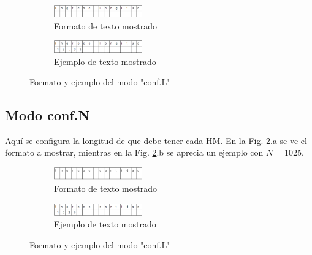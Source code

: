 \documentclass[main_conf.tex]{subfiles}
\begin{document}
\begin{figure}[!t]
  \centering
  \begin{subfigure}[b]{0.5\textwidth}
    \centering
    \includegraphics[width=1.5in]{../img/modo/conf_L_view.png}
    \caption{Formato de texto mostrado}
  \end{subfigure}

  \begin{subfigure}[b]{0.5\textwidth}
    \centering
    \includegraphics[width=1.5in]{../img/modo/conf_L_sample.png}
    \caption{Ejemplo de texto mostrado}
  \end{subfigure}

  \caption{Formato y ejemplo del modo "conf.L"}
  \label{Modo_Conf_L}
\end{figure}

\subsection{Modo conf.N}
Aquí se configura la longitud de que debe tener cada HM.
En la Fig. \ref{Modo_Conf_N}.a se ve el formato a mostrar,
mientras en la Fig. \ref{Modo_Conf_N}.b se aprecia un
ejemplo con $N = 1025$.

\begin{figure}[!t]
  \centering
  \begin{subfigure}[b]{0.5\textwidth}
    \centering
    \includegraphics[width=1.5in]{../img/modo/conf_N_view.png}
    \caption{Formato de texto mostrado}
  \end{subfigure}

  \begin{subfigure}[b]{0.5\textwidth}
    \centering
    \includegraphics[width=1.5in]{../img/modo/conf_N_sample.png}
    \caption{Ejemplo de texto mostrado}
  \end{subfigure}

  \caption{Formato y ejemplo del modo "conf.L"}
  \label{Modo_Conf_N}
\end{figure}
\end{document}
